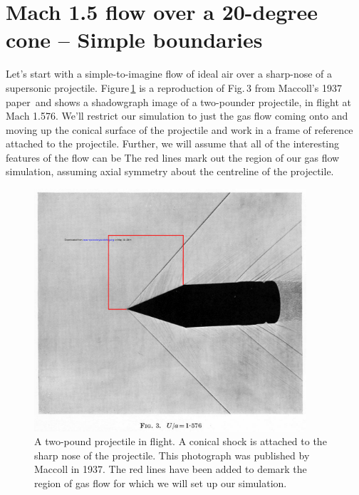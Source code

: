 
\section{Mach 1.5 flow over a 20-degree cone -- Simple boundaries}
\label{cone20-simple-sec}
%
Let's start with a simple-to-imagine flow of ideal air over a sharp-nose of a supersonic projectile.
Figure\,\ref{cone20-flight-fig} is a reproduction of Fig.\,3 from Maccoll's 1937 paper\,\cite{maccoll_1937a} 
and shows a shadowgraph image of a two-pounder projectile, in flight at Mach 1.576.
We'll restrict our simulation to just the gas flow coming onto and moving up the conical surface 
of the projectile and work in a frame of reference attached to the projectile.
Further, we will assume that all of the interesting features of the flow can be 
The red lines mark out the region of our gas flow simulation, 
assuming axial symmetry about the centreline of the projectile.

\begin{figure}[htbp]
\begin{center}
\includegraphics[width=0.9\textwidth, viewport=76 168 949 761, clip=true]{../2D/cone20-simple/maccoll-1937-fig3.pdf}
\end{center}
\caption{A two-pound projectile in flight.  A conical shock is attached to the sharp nose of the projectile. 
	 This photograph was published by Maccoll in 1937.
	 The red lines have been added to demark the region of gas flow for which we will set up our simulation.}
\label{cone20-flight-fig}
\end{figure}

